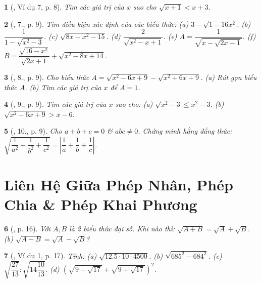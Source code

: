 \documentclass{article}
\newtheorem{baitoan}{}%
\begin{document}
\begin{baitoan}[\cite{Binh_Toan_9_tap_1}, Ví dụ 7, p. 8]
	Tìm các giá trị của $x$ sao cho $\sqrt{x + 1} < x + 3$.
\end{baitoan}

\begin{baitoan}[\cite{Binh_Toan_9_tap_1}, 7., p. 9]
	Tìm điều kiện xác định của các biểu thức: (a) $3 - \sqrt{1 - 16x^2}$. (b) $\dfrac{1}{1 - \sqrt{x^2 - 3}}$. (c) $\sqrt{8x - x^2 - 15}$. (d) $\dfrac{2}{\sqrt{x^2 - x + 1}}$. (e) $A = \dfrac{1}{\sqrt{x - \sqrt{2x - 1}}}$. (f) $B = \dfrac{\sqrt{16 - x^2}}{\sqrt{2x + 1}} + \sqrt{x^2 - 8x + 14}$.
\end{baitoan}

\begin{baitoan}[\cite{Binh_Toan_9_tap_1}, 8., p. 9]
	Cho biểu thức $A = \sqrt{x^2 - 6x + 9} - \sqrt{x^2 + 6x + 9}$. (a) Rút gọn biểu thức $A$. (b) Tìm các giá trị của $x$ để $A = 1$.
\end{baitoan}

\begin{baitoan}[\cite{Binh_Toan_9_tap_1}, 9., p. 9]
	Tìm các giá trị của $x$ sao cho: (a) $\sqrt{x^2 - 3}\le x^2 - 3$. (b) $\sqrt{x^2 - 6x + 9} > x - 6$.
\end{baitoan}

\begin{baitoan}[\cite{Binh_Toan_9_tap_1}, 10., p. 9]
	Cho $a + b + c = 0$ \& $abc\ne0$. Chứng minh hằng đẳng thức: $\sqrt{\dfrac{1}{a^2} + \dfrac{1}{b^2} + \dfrac{1}{c^2}} = \left|\dfrac{1}{a} + \dfrac{1}{b} + \dfrac{1}{c}\right|$.
\end{baitoan}


\section{Liên Hệ Giữa Phép Nhân, Phép Chia \& Phép Khai Phương}

\begin{baitoan}[\cite{Binh_boi_duong_Toan_9_tap_1}, p. 16]
	Với $A,B$ là 2 biểu thức đại số. Khi nào thì: $\sqrt{A + B} = \sqrt{A} + \sqrt{B}$. (b) $\sqrt{A - B} = \sqrt{A} - \sqrt{B}$?
\end{baitoan}

\begin{baitoan}[\cite{Binh_boi_duong_Toan_9_tap_1}, Ví dụ 1, p. 17]
	Tính: (a) $\sqrt{12.5\cdot10\cdot4500}$. (b) $\sqrt{685^2 - 684^2}$. (c) $\sqrt{\dfrac{27}{13}}:\sqrt{14\dfrac{10}{13}}$. (d) $\left(\sqrt{9 - \sqrt{17}} + \sqrt{9 + \sqrt{17}}\right)^2$.
\end{baitoan}
\end{document}
